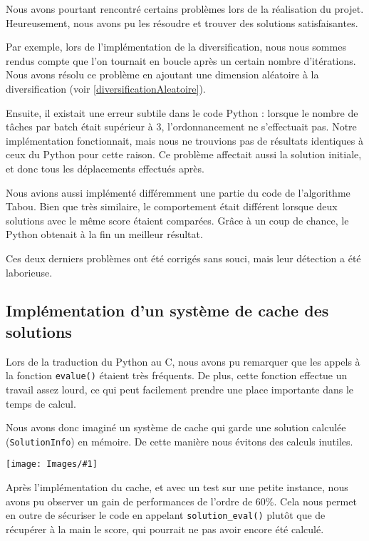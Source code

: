 \documentclass[hideweeklyreports]{polytech/polytech}
\newcommand{\img}[3]{%
	\begin{center}
		\centering
		\texttt{[image: Images/\#1]}
		\captionof{figure}{#2}
	\end{center}
}
\newcommand{\codec}[1]{\texttt{#1}}
\begin{document}
				Nous avons pourtant rencontré certains problèmes lors de la réalisation du projet. Heureusement, nous avons pu les résoudre et trouver des solutions satisfaisantes.
				
				Par exemple, lors de l'implémentation de la diversification, nous nous sommes rendus compte que l'on tournait en boucle après un certain nombre d'itérations. Nous avons résolu ce problème en ajoutant une dimension aléatoire à la diversification (voir \autoref{diversificationAleatoire}).
				
				Ensuite, il existait une erreur subtile dans le code Python : lorsque le nombre de tâches par batch était supérieur à 3, l'ordonnancement ne s'effectuait pas. Notre implémentation fonctionnait, mais nous ne trouvions pas de résultats identiques à ceux du Python pour cette raison. Ce problème affectait aussi la solution initiale, et donc tous les déplacements effectués après.
				
				Nous avions aussi implémenté différemment une partie du code de l'algorithme Tabou. Bien que très similaire, le comportement était différent lorsque deux solutions avec le même score étaient comparées. Grâce à un coup de chance, le Python obtenait à la fin un meilleur résultat.
				
				Ces deux derniers problèmes ont été corrigés sans souci, mais leur détection a été laborieuse.
				
			\subsection{\label{cache}Implémentation d'un système de cache des solutions}
				Lors de la traduction du Python au C, nous avons pu remarquer que les appels à la fonction \codec{evalue()} étaient très fréquents. De plus, cette fonction effectue un travail assez lourd, ce qui peut facilement prendre une place importante dans le temps de calcul.
				
				Nous avons donc imaginé un système de cache qui garde une solution calculée (\codec{SolutionInfo}) en mémoire. De cette manière nous évitons des calculs inutiles.
				
				\img{PythonProfilerTop.png}{Profiler exécuté sur le python}{0.3}
				
				Après l'implémentation du cache, et avec un test sur une petite instance, nous avons pu observer un gain de performances de l'ordre de 60\%. Cela nous permet en outre de sécuriser le code en appelant \codec{solution\_eval()} plutôt que de récupérer à la main le score, qui pourrait ne pas avoir encore été calculé.
			
\end{document}
